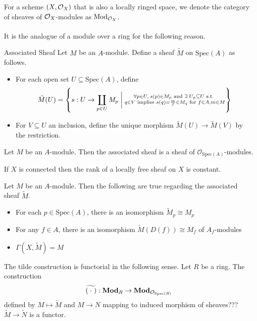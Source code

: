 \documentclass[a4paper]{article}
\begin{document}
For a scheme $(X,\mathcal{O}_X)$ that is also a locally ringed space, we denote the category of sheaves of $\mathcal{O}_X$-modules as $\text{Mod}_{\mathcal{O}_X}$. \\~\\

It is the analogue of a module over a ring for the following reason. 

\begin{defn}{Associated Sheaf}{} Let $M$ be an $A$-module. Define a sheaf $\tilde{M}$ on $\text{Spec}(A)$ as follows. 
\begin{itemize}
\item For each open set $U\subseteq\text{Spec}(A)$, define $$\tilde{M}(U)=\left\{s:U\to\coprod_{p\in U}M_p\;\bigg{|}\;\substack{\forall p\in U,\;s(p)\in M_p\text{ and }\exists\;U_p\subseteq U\text{ s.t. }\\q\in V\text{ implies }s(q)=\frac{m}{f}\in M_q\text{ for }f\in A,m\in M}\right\}$$
\item For $V\subseteq U$ an inclusion, define the unique morphism $\tilde{M}(U)\to\tilde{M}(V)$ by the restriction. 
\end{itemize}
\end{defn}

\begin{lmm}{}{} Let $M$ be an $A$-module. Then the associated sheaf is a sheaf of $\mathcal{O}_{\text{Spec}(A)}$-modules. 
\end{lmm}

\begin{lmm}{}{} If $X$ is connected then the rank of a locally free sheaf on $X$ is constant. 
\end{lmm}

\begin{thm}{}{} Let $M$ be an $A$-module. Then the following are true regarding the associated sheaf $\tilde{M}$. 
\begin{itemize}
\item For each $p\in\text{Spec}(A)$, there is an isomorphism $\tilde{M}_p\cong M_p$
\item For any $f\in A$, there is an isomorphism $\tilde{M}(D(f))\cong M_f$ of $A_f$-modules
\item $\Gamma(X,\tilde{M})=M$
\end{itemize}
\end{thm}

\begin{thm}{}{} The tilde construction is functorial in the following sense. Let $R$ be a ring. The construction $$\widetilde{(\;\cdot\;)}:\bold{Mod}_R\to\bold{Mod}_{\mathcal{O}_{\text{Spec}(R)}}$$ defined by $M\mapsto\widetilde{M}$ and $M\to N$ mapping to induced morphism of sheaves??? $\widetilde{M}\to\widetilde{N}$ is a functor. 
\end{thm}
\end{document}
